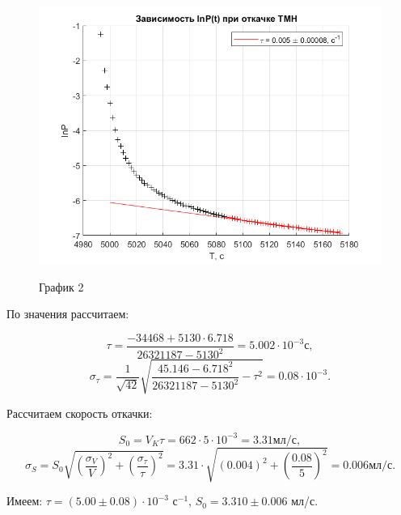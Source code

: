 \documentclass[a4paper,12pt]{article}
\begin{document}
\begin{enumerate}
\begin{enumerate}
\begin{figure}
\centering
\includegraphics[width=0.8\linewidth]{plot2.png}
\label{fig2}
\caption{График 2}
\end{figure}

По значения рассчитаем:

\[
\tau = \frac{ -34468  +  5130 \cdot 6.718 }{ 26321187  -  5130 ^ 2} = 5.002 \cdot 10^{-3} \text{с},
\]
\[
\sigma_\tau = \frac{1}{\sqrt{42}}\sqrt{\frac{45.146 - 6.718 ^ 2}{  26321187  -  5130 ^ 2} - \tau^2} = 0.08 \cdot 10^{-3}.
\]

Рассчитаем скорость откачки:

\[
S_0 = V_K \tau = 662 \cdot 5 \cdot 10^{-3} = 3.31 \text{мл/с}, 
\]
\[
\sigma_S = S_0 \sqrt{\left( \frac{\sigma_V}{V} \right)^2 + \left( \frac{\sigma_\tau}{\tau} \right)^2} = 3.31 \cdot \sqrt{\left( 0.004 \right)^2 + \left( \frac{0.08}{5} \right)^2} = 0.006 \text{мл/с}.
\]

Имеем: $\tau = (5.00 \pm 0.08) \cdot 10^{-3}$ с$^{-1}$, $S_0 = 3.310 \pm 0.006$ мл/с. 
\end{enumerate}
\end{enumerate}
\end{document}
